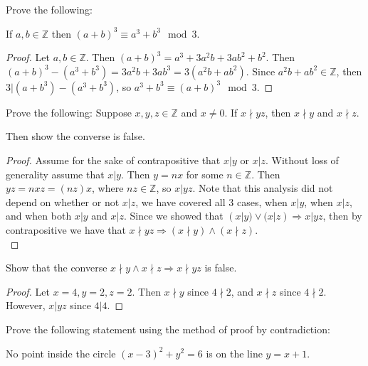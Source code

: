 \documentclass[12 pt]{exam}
\begin{document}
\begin{questions}
\question Prove the following:

If $a,b \in \mathbb{Z}$ then $(a+b)^3 \equiv a^3+b^3 \mod 3$.

\begin{solution}
\begin{proof}
Let $a, b \in \mathbb{Z}$. Then $(a+b)^3 = a^3 + 3a^2 b + 3ab^2 + b^2$.
Then $(a+b)^3 - (a^3 + b^3) = 3a^2b + 3 ab^3 = 3(a^2b + ab^2)$.
Since $a^2b + ab^2 \in \mathbb{Z}$, then $3 | (a+b^3) - (a^3 + b^3)$,
so $a^3 + b^3 \equiv (a+b)^3 \mod 3$.

\end{proof}
\end{solution}


\question Prove the following:
Suppose $x, y, z \in \mathbb{Z}$ and $x \neq 0$. If $x \nmid yz$, then $x \nmid y$ and $x \nmid z$. 

Then show the converse is false. 

\begin{solution}
\begin{proof}
    Assume for the sake of contrapositive that $x | y$ or $x | z$.
    Without loss of generality assume that $x | y$. Then $y = nx$ for some $n \in \mathbb{Z}$.
    Then $yz = nxz = (nz)x$, where $nz \in \mathbb{Z}$, so $x | yz$.
    Note that this analysis did not depend on whether or not $x | z$, we have covered all
    3 cases, when $x|y$, when $x|z$, and when both $x|y$ and $x|z$.
    Since we showed that $(x|y) \lor (x|z) \Rightarrow x | yz$, then by contrapositive
    we have that $x \nmid yz \Rightarrow (x \nmid y) \land (x \nmid z)$.\\
\end{proof}

Show that the converse $x \nmid y \land x \nmid z \Rightarrow x \nmid yz$ is false.

\begin{proof}
    Let $x = 4, y = 2, z = 2$. Then $x \nmid y$ since $4 \nmid 2$, and $x \nmid z$ since $4 \nmid 2$.
    However, $x | yz$ since $4 | 4$.
\end{proof}
\end{solution}


\question Prove the following statement using the method of proof by contradiction:

No point inside the circle $(x-3)^2+y^2=6$ is on the line $y=x+1$.


\end{questions}
\end{document}
